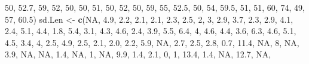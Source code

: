 \documentclass[
]{krantz}
\makeatletter
\newenvironment{Shaded}{\begin{snugshade}}{\end{snugshade}}
\newcommand{\ConstantTok}[1]{\textcolor[rgb]{0.37,0.37,0.37}{#1}}
\newcommand{\DecValTok}[1]{\textcolor[rgb]{0.06,0.06,0.06}{#1}}
\newcommand{\FloatTok}[1]{\textcolor[rgb]{0.06,0.06,0.06}{#1}}
\newcommand{\FunctionTok}[1]{\textcolor[rgb]{0.27,0.27,0.27}{\textbf{#1}}}
\newcommand{\NormalTok}[1]{#1}
\newcommand{\OtherTok}[1]{\textcolor[rgb]{0.37,0.37,0.37}{#1}}
\newenvironment{kframe}{%
\medskip{}
\setlength{\fboxsep}{.8em}
 \def\at@end@of@kframe{}%
 \ifinner\ifhmode%
  \def\at@end@of@kframe{\end{minipage}}%
  \begin{minipage}{\columnwidth}%
 \fi\fi%
 \def\FrameCommand##1{\hskip\@totalleftmargin \hskip-\fboxsep
 \colorbox{shadecolor}{##1}\hskip-\fboxsep
     \hskip-\linewidth \hskip-\@totalleftmargin \hskip\columnwidth}%
 \MakeFramed {\advance\hsize-\width
   \@totalleftmargin\z@ \linewidth\hsize
   \@setminipage}}%
 {\par\unskip\endMakeFramed%
 \at@end@of@kframe}
\renewenvironment{Shaded}{\begin{kframe}}{\end{kframe}}
\makeatother
\begin{document}
\begin{Shaded}
\begin{Highlighting}[]
             \DecValTok{50}\NormalTok{, }\FloatTok{52.7}\NormalTok{, }\DecValTok{59}\NormalTok{, }\DecValTok{52}\NormalTok{, }\DecValTok{50}\NormalTok{, }\DecValTok{50}\NormalTok{, }\DecValTok{51}\NormalTok{, }\DecValTok{50}\NormalTok{, }\DecValTok{52}\NormalTok{, }\DecValTok{50}\NormalTok{, }\DecValTok{59}\NormalTok{, }\DecValTok{55}\NormalTok{, }\FloatTok{52.5}\NormalTok{, }\DecValTok{50}\NormalTok{,}
             \DecValTok{54}\NormalTok{, }\FloatTok{59.5}\NormalTok{, }\DecValTok{51}\NormalTok{, }\DecValTok{51}\NormalTok{, }\DecValTok{60}\NormalTok{, }\DecValTok{74}\NormalTok{, }\DecValTok{49}\NormalTok{, }\DecValTok{57}\NormalTok{, }\FloatTok{60.5}\NormalTok{)}
\NormalTok{sd.Len }\OtherTok{\textless{}{-}} \FunctionTok{c}\NormalTok{(}\ConstantTok{NA}\NormalTok{, }\FloatTok{4.9}\NormalTok{, }\FloatTok{2.2}\NormalTok{, }\FloatTok{2.1}\NormalTok{, }\FloatTok{2.1}\NormalTok{, }\FloatTok{2.3}\NormalTok{, }\FloatTok{2.5}\NormalTok{, }\DecValTok{2}\NormalTok{, }\DecValTok{3}\NormalTok{, }\FloatTok{2.9}\NormalTok{, }\FloatTok{3.7}\NormalTok{, }\FloatTok{2.3}\NormalTok{,}
            \FloatTok{2.9}\NormalTok{, }\FloatTok{4.1}\NormalTok{, }\FloatTok{2.4}\NormalTok{, }\FloatTok{5.1}\NormalTok{, }\FloatTok{4.4}\NormalTok{, }\FloatTok{1.8}\NormalTok{, }\FloatTok{5.4}\NormalTok{, }\FloatTok{3.1}\NormalTok{, }\FloatTok{4.3}\NormalTok{, }\FloatTok{4.6}\NormalTok{, }\FloatTok{2.4}\NormalTok{,}
            \FloatTok{3.9}\NormalTok{, }\FloatTok{5.5}\NormalTok{, }\FloatTok{6.4}\NormalTok{, }\DecValTok{4}\NormalTok{, }\FloatTok{4.6}\NormalTok{, }\FloatTok{4.4}\NormalTok{, }\FloatTok{3.6}\NormalTok{, }\FloatTok{6.3}\NormalTok{, }\FloatTok{4.6}\NormalTok{, }\FloatTok{5.1}\NormalTok{, }\FloatTok{4.5}\NormalTok{,}
            \FloatTok{3.4}\NormalTok{, }\DecValTok{4}\NormalTok{, }\FloatTok{2.5}\NormalTok{, }\FloatTok{4.9}\NormalTok{, }\FloatTok{2.5}\NormalTok{, }\FloatTok{2.1}\NormalTok{, }\FloatTok{2.0}\NormalTok{, }\FloatTok{2.2}\NormalTok{, }\FloatTok{5.9}\NormalTok{, }\ConstantTok{NA}\NormalTok{, }\FloatTok{2.7}\NormalTok{,}
            \FloatTok{2.5}\NormalTok{, }\FloatTok{2.8}\NormalTok{, }\FloatTok{0.7}\NormalTok{, }\FloatTok{11.4}\NormalTok{, }\ConstantTok{NA}\NormalTok{, }\DecValTok{8}\NormalTok{, }\ConstantTok{NA}\NormalTok{, }\FloatTok{3.9}\NormalTok{, }\ConstantTok{NA}\NormalTok{, }\ConstantTok{NA}\NormalTok{, }\FloatTok{1.4}\NormalTok{, }\ConstantTok{NA}\NormalTok{,}
            \DecValTok{1}\NormalTok{, }\ConstantTok{NA}\NormalTok{, }\FloatTok{9.9}\NormalTok{, }\FloatTok{1.4}\NormalTok{, }\FloatTok{2.1}\NormalTok{, }\DecValTok{0}\NormalTok{, }\DecValTok{1}\NormalTok{, }\FloatTok{13.4}\NormalTok{, }\FloatTok{1.4}\NormalTok{, }\ConstantTok{NA}\NormalTok{, }\FloatTok{12.7}\NormalTok{, }\ConstantTok{NA}\NormalTok{,}

\end{Highlighting}
\end{Shaded}
\end{document}
